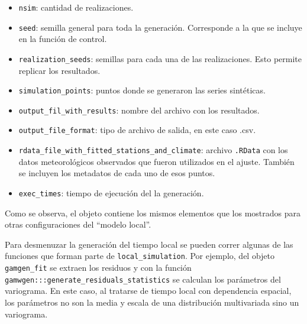 \documentclass[
  12pt]{article}
\newenvironment{Shaded}{}{}
\newcommand{\CommentTok}[1]{\textcolor[rgb]{0.38,0.63,0.69}{\textit{#1}}}
\newcommand{\DataTypeTok}[1]{\textcolor[rgb]{0.56,0.13,0.00}{#1}}
\newcommand{\DecValTok}[1]{\textcolor[rgb]{0.25,0.63,0.44}{#1}}
\newcommand{\KeywordTok}[1]{\textcolor[rgb]{0.00,0.44,0.13}{\textbf{#1}}}
\newcommand{\NormalTok}[1]{#1}
\newcommand{\OperatorTok}[1]{\textcolor[rgb]{0.40,0.40,0.40}{#1}}
\newcommand{\StringTok}[1]{\textcolor[rgb]{0.25,0.44,0.63}{#1}}
\providecommand{\tightlist}{%
  \setlength{\itemsep}{0pt}\setlength{\parskip}{0pt}}
\begin{document}
\begin{itemize}
\tightlist
\item
  \texttt{nsim}: cantidad de realizaciones.
\item
  \texttt{seed}: semilla general para toda la generación. Corresponde a la que se incluye en la función de control.
\item
  \texttt{realization\_seeds}: semillas para cada una de las realizaciones. Esto permite replicar los resultados.
\item
  \texttt{simulation\_points}: puntos donde se generaron las series sintéticas.
\item
  \texttt{output\_fil\_with\_results}: nombre del archivo con los resultados.
\item
  \texttt{output\_file\_format}: tipo de archivo de salida, en este caso .csv.
\item
  \texttt{rdata\_file\_with\_fitted\_stations\_and\_climate}: archivo \texttt{.RData} con los datos meteorológicos observados que fueron utilizados en el ajuste. También se incluyen los metadatos de cada uno de esos puntos.
\item
  \texttt{exec\_times}: tiempo de ejecución del la generación.
\end{itemize}

Como se observa, el objeto contiene los mismos elementos que los mostrados para otras configuraciones del ``modelo local''.

Para desmenuzar la generación del tiempo local se pueden correr algunas de las funciones que forman parte de \texttt{local\_simulation}. Por ejemplo, del objeto \texttt{gamgen\_fit} se extraen los residuos y con la función \texttt{gamwgen:::generate\_residuals\_statistics} se calculan los parámetros del variograma. En este caso, al tratarse de tiempo local con dependencia espacial, los parámetros no son la media y escala de una distribución multivariada sino un variograma.

\begin{Shaded}
\end{Shaded}
\end{document}
